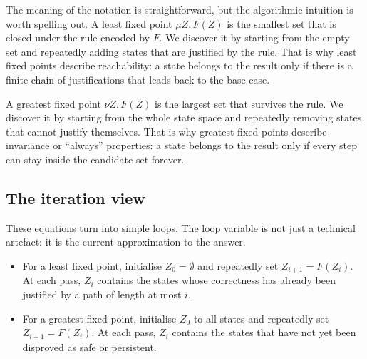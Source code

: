 The meaning of the notation is straightforward, but the algorithmic intuition
is worth spelling out.  A least fixed point $\mu Z.\,F(Z)$ is the smallest set
that is closed under the rule encoded by $F$.  We discover it by starting from
the empty set and repeatedly adding states that are justified by the rule.
That is why least fixed points describe reachability: a state belongs to the
result only if there is a finite chain of justifications that leads back to
the base case.

A greatest fixed point $\nu Z.\,F(Z)$ is the largest set that survives the
rule.  We discover it by starting from the whole state space and repeatedly
removing states that cannot justify themselves.  That is why greatest fixed
points describe invariance or ``always'' properties: a state belongs to the
result only if every step can stay inside the candidate set forever.

\subsection{The iteration view}

These equations turn into simple loops.  The loop variable is not just a
technical artefact: it is the current approximation to the answer.
\begin{itemize}
  \item For a least fixed point, initialise $Z_0 = \emptyset$ and repeatedly
        set $Z_{i+1} = F(Z_i)$.  At each pass, $Z_i$ contains the states whose
        correctness has already been justified by a path of length at most
        $i$.
  \item For a greatest fixed point, initialise $Z_0$ to all states and
        repeatedly set $Z_{i+1} = F(Z_i)$.  At each pass, $Z_i$ contains the
        states that have not yet been disproved as safe or persistent.
\end{itemize}

